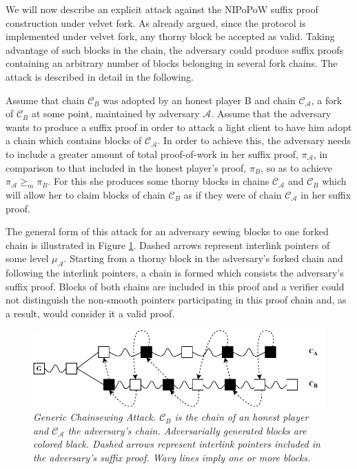 We  will now describe an explicit attack against the NIPoPoW suffix proof construction under velvet fork. As already argued, since the protocol is implemented under velvet fork, any thorny block be accepted as valid. Taking advantage of such blocks in the chain, the adversary could produce suffix proofs containing an arbitrary number of blocks belonging in several fork chains. The attack is described in detail in the following.

Assume that chain $\mathcal{C}_B$ was adopted by an honest player B and chain $\mathcal{C}_\mathcal{A}$, a fork of $\mathcal{C}_B$ at some point, maintained by adversary $\mathcal{A}$. Assume that the adversary wants to produce a suffix  proof in order to attack a light client to have him adopt a chain which contains blocks of $\mathcal{C}_\mathcal{A}$. In order to achieve this, the adversary needs to include a greater amount of total proof-of-work in her suffix proof, $\pi_\mathcal{A}$, in comparison to that included in the honest player's proof, $\pi_B$, so as to achieve $\pi_\mathcal{A} \geq_m \pi_B$. For this she produces some thorny blocks in chains $\mathcal{C}_\mathcal{A}$ and $\mathcal{C}_B$ which will allow her to claim blocks of chain $\mathcal{C}_B$ as if they were of chain $\mathcal{C}_\mathcal{A}$ in her suffix proof.

The general form of this attack for an adversary sewing blocks to one forked chain is illustrated in Figure \ref{fig:generic_attack}. Dashed arrows represent interlink pointers of some level $\mu_\mathcal{A}$. Starting from a thorny block in the adversary's forked chain and following the interlink pointers, a chain is formed which consists the adversary's suffix proof. Blocks of both chains are included in this proof and a verifier could not distinguish the non-smooth pointers participating in this proof chain and, as a result, would consider it a valid proof.

\begin{figure}[h]
	\begin{center}
		\includegraphics[scale=0.63
		]{figures/generic_chainsewing_attack.pdf}
	\end{center}
	\caption{\textit{Generic Chainsewing Attack. $\mathcal{C}_B$ is the chain of an honest 	player and $\mathcal{C}_\mathcal{A}$ the adversary's chain. Adversarially generated blocks are 	colored black. Dashed arrows represent interlink pointers included in the 	adversary's suffix proof. Wavy lines imply one or more blocks.}}
	\label{fig:generic_attack}
\end{figure}

